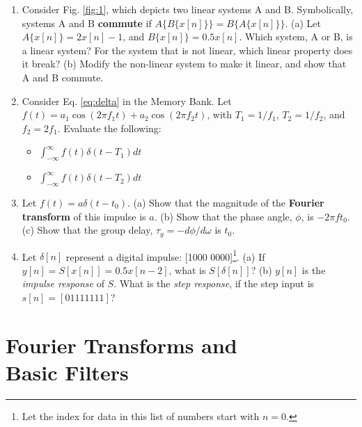 \documentclass{article}
\begin{document}
\begin{enumerate}
\item Consider Fig. \ref{fig:1}, which depicts two linear systems A and B.  Symbolically, systems A and B \textbf{commute} if $A\lbrace B\lbrace x[n] \rbrace\rbrace = B\lbrace A\lbrace x[n] \rbrace\rbrace$.  (a) Let $A\lbrace x[n] \rbrace = 2x[n]-1$, and $B\lbrace x[n] \rbrace = 0.5x[n]$.  Which system, A or B, is a linear system?  For the system that is not linear, which linear property does it break? (b) Modify the non-linear system to make it linear, and show that A and B commute. \\ \vspace{4cm}
\item Consider Eq. \ref{eq:delta} in the Memory Bank.  Let $f(t) = a_1\cos(2\pi f_1 t) + a_2\cos(2\pi f_2 t)$, with $T_1 = 1/f_1$, $T_2 = 1/f_2$, and $f_2 = 2f_1$.  Evaluate the following:
\begin{itemize}
\item $\int_{-\infty}^{\infty} f(t) \delta(t-T_1) dt$
\item $\int_{-\infty}^{\infty} f(t) \delta(t-T_2) dt$
\end{itemize} \vspace{4cm}
\item Let $f(t) = a\delta(t-t_0)$.  (a) Show that the magnitude of the \textbf{Fourier transform} of this impulse is $a$. (b) Show that the phase angle, $\phi$, is $-2\pi ft_0$. (c) Show that the group delay, $\tau_g = -d\phi/d\omega$ is $t_0$. \\ \vspace{4cm}
\item Let $\delta[n]$ represent a digital impulse: [1000 0000]\footnote{Let the index for data in this list of numbers start with $n=0$.}. (a) If $y[n] = S[x[n]] = 0.5x[n-2]$, what is $S[\delta[n]]$? (b) $y[n]$ is the \textit{impulse response} of $S$.  What is the \textit{step response}, if the step input is $s[n] = [0111 1111]$? \\ \vspace{4cm}
\end{enumerate}

\section{Fourier Transforms and \\ Basic Filters}
\end{document}
